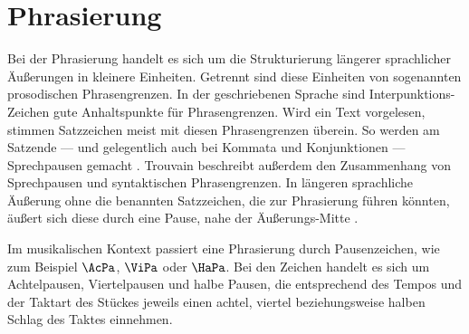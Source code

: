 








\section{Phrasierung}
\label{sec:Phrasierung}

Bei der Phrasierung handelt es sich um die Strukturierung längerer sprachlicher Äußerungen in kleinere Einheiten. Getrennt sind diese Einheiten von sogenannten prosodischen Phrasengrenzen. In der geschriebenen Sprache sind Interpunktions-Zeichen gute Anhaltspunkte für Phrasengrenzen. Wird ein Text vorgelesen, stimmen Satzzeichen meist mit diesen Phrasengrenzen überein. So werden am Satzende — und gelegentlich auch bei Kommata und Konjunktionen — Sprechpausen gemacht \cite{trouvain2018}. Trouvain beschreibt außerdem den Zusammenhang von Sprechpausen und syntaktischen Phrasengrenzen. In längeren sprachliche Äußerung ohne die benannten Satzzeichen, die zur Phrasierung führen könnten, äußert sich diese durch eine Pause, nahe der Äußerungs-Mitte \cite{gee1983performance}.

Im musikalischen Kontext passiert eine Phrasierung durch Pausenzeichen, wie zum Beispiel $\AcPa$, $\ViPa$ oder $\HaPa$. Bei den Zeichen handelt es sich um Achtelpausen, Viertelpausen und halbe Pausen, die entsprechend des Tempos und der Taktart des Stückes jeweils einen achtel, viertel beziehungsweise halben Schlag des Taktes einnehmen.